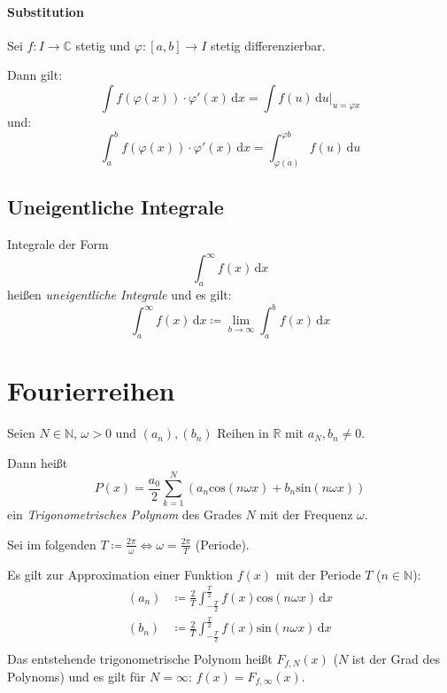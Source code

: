 			\paragraph{Substitution}
				Sei $ f : I \rightarrow \mathbb{C} $ stetig und $ \varphi : [a, b] \rightarrow I $ stetig differenzierbar.

				Dann gilt:
				\begin{equation*}
					\int \! f(\varphi(x)) \cdot \varphi'(x) \, \mathrm{d}x = \int \! f(u) \, \mathrm{d}u \Bigr| _ { u = \varphi{x} }
				\end{equation*}
				und:
				\begin{equation*}
					\int _ a ^ b \! f(\varphi(x)) \cdot \varphi'(x) \, \mathrm{d}x = \int _ { \varphi(a) } ^ { \varphi{b} } \! f(u) \, \mathrm{d}u
				\end{equation*}

		\subsection{Uneigentliche Integrale}
			Integrale der Form \[ \int _ a ^ \infty \! f(x) \, \mathrm{d}x \] heißen \textit{uneigentliche Integrale} und es gilt:
			\begin{equation*}
				\int _ a ^ \infty \! f(x) \, \mathrm{d}x \coloneqq \lim _ { b \rightarrow \infty } \int _ a ^ b \! f(x) \, \mathrm{d}x
			\end{equation*}

	\section{Fourierreihen}
		Seien $ N \in \mathbb{N} $, $ \omega > 0 $ und $ (a _ n), (b _ n) $ Reihen in $ \mathbb{R} $ mit $ a _ N, b _ n \neq 0 $.

		Dann heißt \[ P(x) = \frac{a _ 0}{2} \sum _ { k = 1 } ^ N (a _ n \text{cos}(n \omega x) + b _ n \text{sin}(n \omega x)) \] ein \textit{Trigonometrisches Polynom} des Grades $ N $ mit der Frequenz $ \omega $.

		Sei im folgenden $ T \coloneqq \frac{2\pi}{\omega} \iff \omega = \frac{2\pi}{T} $ (Periode).

		Es gilt zur Approximation einer Funktion $ f(x) $ mit der Periode $ T $ ($ n \in \mathbb{N} $):
		\begin{align*}
			(a _ n) & \coloneqq \frac{2}{T} \int _ { - \frac{T}{2} } ^ \frac{T}{2} \! f(x) \text{cos}(n \omega x) \, \mathrm{d}x \\
			(b _ n) & \coloneqq \frac{2}{T} \int _ { - \frac{T}{2} } ^ \frac{T}{2} \! f(x) \text{sin}(n \omega x) \, \mathrm{d}x \\
		\end{align*}
		Das entstehende trigonometrische Polynom heißt $ F _ { f, N } (x) $ ($ N $ ist der Grad des Polynoms) und es gilt für $ N = \infty $: $ f(x) = F _ { f, \infty } (x) $.


